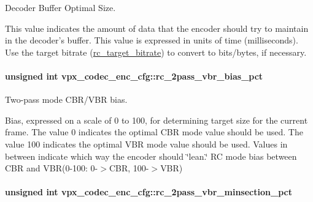 \-Decoder \-Buffer \-Optimal \-Size. 

\-This value indicates the amount of data that the encoder should try to maintain in the decoder's buffer. \-This value is expressed in units of time (milliseconds). \-Use the target bitrate (\hyperlink{structvpx__codec__enc__cfg_ab8339685175d66710f482706cc9f0aed}{rc\-\_\-target\-\_\-bitrate}) to convert to bits/bytes, if necessary. \hypertarget{structvpx__codec__enc__cfg_a21c21ff097890dc3a450731c9b504cf4}{
\paragraph[{rc\-\_\-2pass\-\_\-vbr\-\_\-bias\-\_\-pct}]{\setlength{\rightskip}{0pt plus 5cm}unsigned int {\bf vpx\-\_\-codec\-\_\-enc\-\_\-cfg\-::rc\-\_\-2pass\-\_\-vbr\-\_\-bias\-\_\-pct}}}
\label{structvpx__codec__enc__cfg_a21c21ff097890dc3a450731c9b504cf4}


\-Two-\/pass mode \-C\-B\-R/\-V\-B\-R bias. 

\-Bias, expressed on a scale of 0 to 100, for determining target size for the current frame. \-The value 0 indicates the optimal \-C\-B\-R mode value should be used. \-The value 100 indicates the optimal \-V\-B\-R mode value should be used. \-Values in between indicate which way the encoder should \char`\"{}lean.\char`\"{} \-R\-C mode bias between \-C\-B\-R and \-V\-B\-R(0-\/100\-: 0-\/$>$\-C\-B\-R, 100-\/$>$\-V\-B\-R) \hypertarget{structvpx__codec__enc__cfg_a21eb9fce0844ae07b617bf3f0a25f5a5}{
\paragraph[{rc\-\_\-2pass\-\_\-vbr\-\_\-minsection\-\_\-pct}]{\setlength{\rightskip}{0pt plus 5cm}unsigned int {\bf vpx\-\_\-codec\-\_\-enc\-\_\-cfg\-::rc\-\_\-2pass\-\_\-vbr\-\_\-minsection\-\_\-pct}}}
\label{structvpx__codec__enc__cfg_a21eb9fce0844ae07b617bf3f0a25f5a5}


